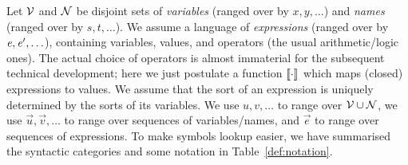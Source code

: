 Let $\mathcal V$ and $\mathcal{N}$ be disjoint sets
of \emph{variables} (ranged over by $x,y,\ldots$) and 
\emph{names} (ranged over by $s,t,\ldots$).
%
We assume a language of \emph{expressions}
(ranged over by $\mathit{e}, \mathit{e}', \ldots$),
containing variables, values, and operators 
(\eg the usual arithmetic/logic ones).
The actual choice of operators is almost immaterial for the
subsequent technical development; here we just postulate
a function $\mbox{\ensuremath{\llbracket{\cdot}\rrbracket_{}}}$ which maps (closed) expressions to values.
We assume that the sort of an expression is uniquely determined 
by the sorts of its variables.
We use $u,v,\ldots$ to range over $\mathcal V \cup \mathcal{N}$,
we use $\vec{u},\vec{v},\ldots$ to range over 
sequences of variables/names, and
$\vec{e}$ to range over sequences of expressions.
To make symbols lookup easier, we have summarised the syntactic categories 
and some notation in Table~\ref{def:notation}.

	
	
	
